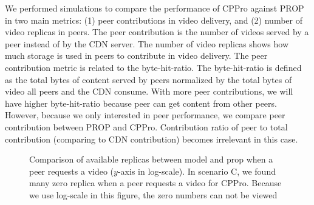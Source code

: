 \documentclass[10pt,final,journal,a4paper]{IEEEtran}
\begin{document}
We performed simulations to compare the performance of CPPro against PROP in two main metrics: (1) peer contributions in video delivery, and (2) number of video replicas in peers.
The peer contribution is the number of videos served by a peer instead of by the CDN server.
The number of video replicas shows how much storage is used in peers to contribute in video delivery.
The peer contribution metric is related to the byte-hit-ratio. 
The byte-hit-ratio is defined as the total bytes of content served by peers normalized by the total bytes of video all peers and the CDN consume.
With more peer contributions, we will have higher byte-hit-ratio because peer can get content from other peers. 
However, because we only interested in peer performance, we compare peer contribution between PROP and CPPro.
Contribution ratio of peer to total contribution (comparing to CDN contribution) becomes irrelevant in this case.


\begin{figure}[!t]
\centering
{}
\hfill
{}
\hfill
{}
\vspace{2mm}
\caption{Comparison of available replicas between model and prop when a peer requests a video ($y$-axis in log-scale).
In scenario C, we found many zero replica when a peer requests a video for CPPro. Because we use log-scale in this figure, the zero numbers can not be viewed}
\label{fig:replica}
\end{figure}
\end{document}
